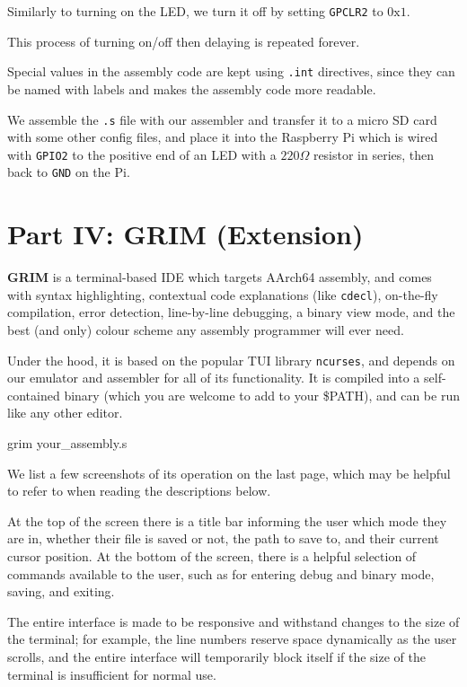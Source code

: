\documentclass{ictex}
\begin{document}
Similarly to turning on the LED, we turn it off by setting \texttt{GPCLR2} to $0\text{x}1$.

This process of turning on/off then delaying is repeated forever.

Special values in the assembly code are kept using \texttt{.int} directives, since they can be named with labels and makes the assembly code more readable.

We assemble the \texttt{.s} file with our assembler and transfer it to a micro SD card with some other config files, and place it into the Raspberry Pi which is wired with \texttt{GPIO2} to the positive end of an LED with a $220\Omega$ resistor in series, then back to \texttt{GND} on the Pi.

\section{Part IV: \textbf{GRIM} (Extension)}

\textbf{GRIM} is a terminal-based IDE which targets AArch64 assembly, and comes with syntax highlighting, contextual
 code explanations (like \texttt{cdecl}), on-the-fly compilation, error detection, line-by-line debugging, a binary view mode, { \color{purple} and the best (and only) colour scheme any assembly programmer will ever need. }

Under the hood, it is based on the popular TUI library \texttt{ncurses}, and depends on our emulator and assembler for all of its functionality. It is compiled into a self-contained binary (which you are welcome to add to your \$PATH), and can be run like any other editor.

\begin{code}
    grim your_assembly.s
\end{code}

We list a few screenshots of its operation on the last page, which may be helpful to refer to when reading the descriptions below.

At the top of the screen there is a title bar informing the user which mode they are in, whether their file is saved or not, the path to save to, and their current cursor position. At the bottom of the screen, there is a helpful selection of commands available to the user, such as for entering debug and binary mode, saving, and exiting.

The entire interface is made to be responsive and withstand changes to the size of the terminal; for example, the line numbers reserve space dynamically as the user scrolls, and the entire interface will temporarily block itself if the size of the terminal is insufficient for normal use.
\end{document}

